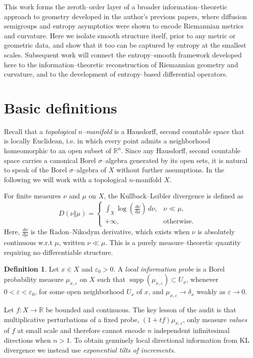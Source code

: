 \documentclass[11pt]{amsart}
\theoremstyle{definition}
\newtheorem{definition}[theorem]{Definition}
\theoremstyle{remark}
\begin{document}
This work forms the zeroth--order layer of a broader information--theoretic approach to geometry developed
in the author’s previous papers, where diffusion semigroups and entropy asymptotics were shown to encode
Riemannian metrics and curvature. Here we isolate smooth structure itself, prior to any metric or geometric
data, and show that it too can be captured by entropy at the smallest scales. Subsequent work will connect
the entropy--smooth framework developed here to the information--theoretic reconstruction of Riemannian
geometry and curvature, and to the development of entropy--based differential operators.

\section{Basic definitions}
Recall that a \emph{topological $n$--manifold} is a Hausdorff, second countable space that is locally Euclidean, i.e. in which every point admits a neighborhood homeomorphic to an open subset of $\mathbb{R}^n$.  
Since any Hausdorff, second countable space carries a canonical Borel $\sigma$--algebra generated by its open sets, it is natural to speak of the Borel $\sigma$--algebra of $X$ without further assumptions. In the following we will work with a topological $n$-manifold $X$.

For finite measures $\nu$ and $\mu$ on $X$, the Kullback--Leibler divergence \cite{kullback1997information} is defined as
\[
D(\nu\Vert\mu)=
\begin{cases}
\displaystyle\int_X \log\!\left( \tfrac{d\nu}{d\mu} \right)\, d\nu, & \nu\ll\mu,\\[1em]
+\infty, & \text{otherwise.}
\end{cases}
\]
Here, $\tfrac{d\nu}{d\mu}$ is the Radon--Nikodym derivative, which exists when $\nu$ is absolutely continuous w.r.t $\mu$, written $\nu\ll\mu$. This is a purely measure--theoretic quantity requiring no differentiable structure.

\begin{definition}
Let $x\in X$ and $\varepsilon_0>0$. A \emph{local information probe} is a Borel probability measure $\mu_{x,\varepsilon}$ on $X$ such that  
$\operatorname{supp}(\mu_{x,\varepsilon}) \subset U_x$, whenever $0<\varepsilon<\varepsilon_0$,
for some open neighborhood $U_x$ of $x$, and $\mu_{x,\varepsilon}\to \delta_x$ weakly as $\varepsilon\to 0$.
\end{definition}


Let $f:X\to\mathbb{R}$ be bounded and continuous.  The key lesson of the audit is that
multiplicative perturbations of a fixed probe, $(1+t f)\mu_{x,\varepsilon}$, only
measure \emph{values} of $f$ at small scale and therefore cannot encode $n$ independent
infinitesimal directions when $n>1$.  To obtain genuinely local directional
information from KL divergence we instead use \emph{exponential tilts of
\emph{increments}}.
\end{document}
